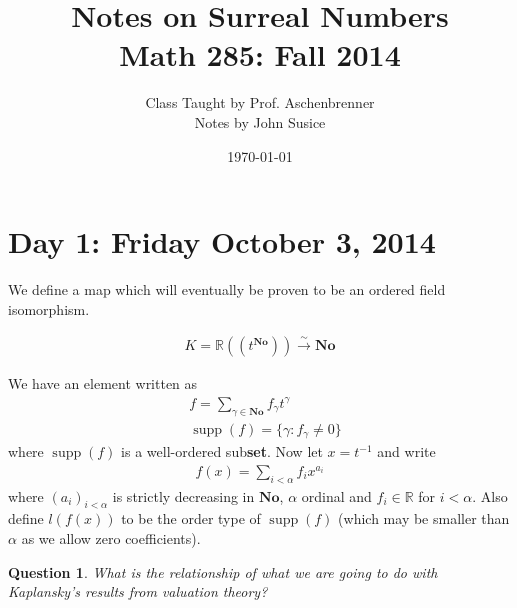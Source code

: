 \documentclass{article}
\title{Notes on Surreal Numbers \\ Math 285: Fall 2014}
\author{Class Taught by Prof. Aschenbrenner \\ Notes by John Susice}
\date{\today}
\newcommand{\No}{\mathbf{No}}
\newtheorem{question}{Question}
\newcommand{\R}{\mathbb{R}}
\DeclareMathOperator{\supp}{supp}
\begin{document}
\maketitle{}

\section*{Day 1: Friday October 3, 2014}

We define a map which will eventually be proven to be an ordered field isomorphism.

\begin{align*}
  K = \R((t^\No)) \overset{\sim}{\longrightarrow} \No
\end{align*}

We have an element written as 
\begin{align*}
	&f = \sum_{\gamma \in \No} f_\gamma t^\gamma \\
	&\supp(f) = \{\gamma \colon f_\gamma \neq 0\}
\end{align*}
where $\supp(f)$ is a well-ordered sub\textbf{set}. Now let $x = t^{-1}$ and write
\begin{align*}
  f(x) = \sum_{i < \alpha} f_i x^{a_i}
\end{align*}
where $(a_i)_{i<\alpha}$ is strictly decreasing in $\No$, $\alpha$ ordinal and $f_i \in \R$ for $i < \alpha$. Also define $l(f(x))$ to be the order type of $\supp(f)$ (which may be smaller than $\alpha$ as we allow zero coefficients).

\begin{question}
	What is the relationship of what we are going to do with Kaplansky's results from valuation theory?
\end{question}
\end{document}
